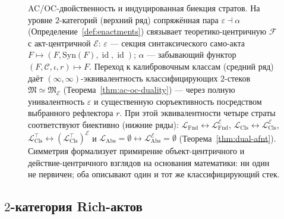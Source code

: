 \documentclass[11pt]{article}
\theoremstyle{plain}
\theoremstyle{definition}
\newcommand{\cF}{\mathcal{F}}
\newcommand{\cC}{\mathcal{C}}
\newcommand{\fM}{\mathfrak{M}}
\newcommand{\LFnd}{\mathcal{L}_{\mathrm{Fnd}}}
\newcommand{\LCls}{\mathcal{L}_{\mathrm{Cls}}}
\newcommand{\LClsMax}{\mathcal{L}_{\mathrm{Cls}}^{\top}}
\newcommand{\LAbs}{\mathcal{L}_{\mathrm{Abs}}}
\newcommand{\Syn}{\mathrm{Syn}}
\newcommand{\cE}{\mathcal{E}}
\newcommand{\fME}{\fM_{\cE}}
\newcommand{\LAbsE}{\LAbs^{\cE}}
\newcommand{\LClsE}{\LCls^{\cE}}
\newcommand{\LClsMaxE}{(\LClsMax)^{\cE}}
\newcommand{\LFndE}{\LFnd^{\cE}}
\DeclareMathOperator{\id}{id}
\begin{document}
\begin{figure}[ht]
\caption{AC/OC-двойственность и индуцированная биекция стратов. На уровне $2$-категорий (верхний ряд) сопряжённая пара $\varepsilon \dashv \alpha$ (Определение~\ref{def:enactments}) связывает теоретико-центричную $\cF$ с акт-центричной $\cE$: $\varepsilon$ — секция синтаксического само-акта $F \mapsto (F, \Syn(F), \id, \id)$; $\alpha$ — забывающий функтор $(F, \cC, \iota, r) \mapsto F$. Переход к калибровочным классам (средний ряд) даёт $(\infty, \infty)$-эквивалентность классифицирующих $2$-стеков $\fM \simeq \fME$ (Теорема~\ref{thm:ac-oc-duality}) — через полную унивалентность $\varepsilon$ и существенную сюръективность посредством выбранного рефлектора $r$. При этой эквивалентности четыре страты соответствуют биективно (нижние ряды): $\LFnd \leftrightarrow \LFndE$, $\LCls \leftrightarrow \LClsE$, $\LClsMax \leftrightarrow \LClsMaxE$ и $\LAbs = \emptyset \leftrightarrow \LAbsE = \emptyset$ (Теорема~\ref{thm:dual-afnt}). Симметрия формализует примирение объект-центричного и действие-центричного взглядов на основания математики: ни один не первичен; оба описывают один и тот же классифицирующий стек.}
\label{fig:ac-oc-duality}
\end{figure}

\subsection{\texorpdfstring{$2$-категория Rich-актов}{2-категория Rich-актов}}
\end{document}
